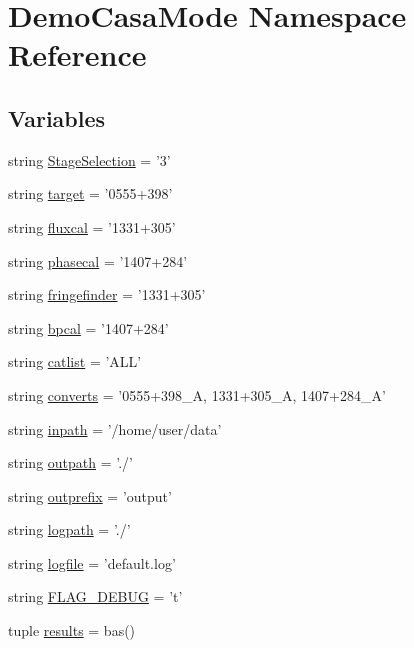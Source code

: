 \hypertarget{namespace_demo_casa_mode}{\section{\-Demo\-Casa\-Mode \-Namespace \-Reference}
\label{namespace_demo_casa_mode}
}
\subsection*{\-Variables}
\begin{DoxyCompactItemize}
\item 
string \hyperlink{namespace_demo_casa_mode_a73bc6f05fe524186ae276c487b78182b}{\-Stage\-Selection} = '3'
\item 
string \hyperlink{namespace_demo_casa_mode_a978ab19eb5b92ca637a0238d580c166a}{target} = '0555+398'
\item 
string \hyperlink{namespace_demo_casa_mode_a614a57418c15e6ba43a8299d68c8b24f}{fluxcal} = '1331+305'
\item 
string \hyperlink{namespace_demo_casa_mode_a7b4979039b3b46b87618c7193fa1b05c}{phasecal} = '1407+284'
\item 
string \hyperlink{namespace_demo_casa_mode_a5a755c946a07f8c5533bbbd9dfe57850}{fringefinder} = '1331+305'
\item 
string \hyperlink{namespace_demo_casa_mode_a1a2a9791e6717f173770807553cdd7a8}{bpcal} = '1407+284'
\item 
string \hyperlink{namespace_demo_casa_mode_ae715ea4a8f2e0b845d79421b2bed9378}{catlist} = '\-A\-L\-L'
\item 
string \hyperlink{namespace_demo_casa_mode_a8d2369517af8b0d5a4a115d27d0147c9}{converts} = '0555+398\-\_\-\-A, 1331+305\-\_\-\-A, 1407+284\-\_\-\-A'
\item 
string \hyperlink{namespace_demo_casa_mode_a4c1241b0cc5a6dc0be40da6f2badb88e}{inpath} = '/home/user/data'
\item 
string \hyperlink{namespace_demo_casa_mode_a9bbc9c0ab07aabe1e0d807407c544038}{outpath} = './'
\item 
string \hyperlink{namespace_demo_casa_mode_aa9b911e3b51564947a8078ee9c2fb16b}{outprefix} = 'output'
\item 
string \hyperlink{namespace_demo_casa_mode_ae476df9959edb4653640850b3b508a37}{logpath} = './'
\item 
string \hyperlink{namespace_demo_casa_mode_a6ac19cf6abe399c43b680ca6b263a858}{logfile} = 'default.\-log'
\item 
string \hyperlink{namespace_demo_casa_mode_a89cb24c6660121b3b93b6b0b126f94c7}{\-F\-L\-A\-G\-\_\-\-D\-E\-B\-U\-G} = 't'
\item 
tuple \hyperlink{namespace_demo_casa_mode_a1029d187c5a20c455a06f52f0e4d3afb}{results} = bas()
\end{DoxyCompactItemize}


